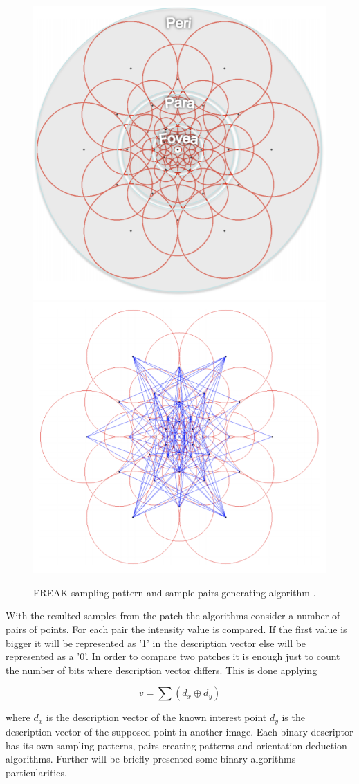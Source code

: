 \documentclass[9pt,shortpaper,twoside,web]{ieeecolor}
\begin{document}
\begin{figure}[htb]
\includegraphics[width=0.5\columnwidth]{res/fig/FREAKsampling.png}
\includegraphics[width=0.5\columnwidth]{res/fig/FREAKsaplePairs.png}
\caption{FREAK sampling pattern and sample pairs generating algorithm \cite{b7}.}
\label{fig7}
\end{figure}

With the resulted samples from the patch the algorithms consider a number of pairs of points. For each pair the intensity value is compared. If the first value is bigger it will be represented as '1' in the description vector else will be represented as a '0'. In order to compare two patches it is enough just to count the number of bits where description vector differs. This is done applying

\begin{equation}
\label{eq10}
v = \sum (d_x \oplus d_y) 
\end{equation}

where $d_x$ is the description vector of the known interest point $d_y$ is the description vector of the supposed point in another image. Each binary descriptor has its own sampling patterns, pairs creating patterns and orientation deduction algorithms. Further will be briefly presented some binary algorithms particularities.\\
\end{document}
